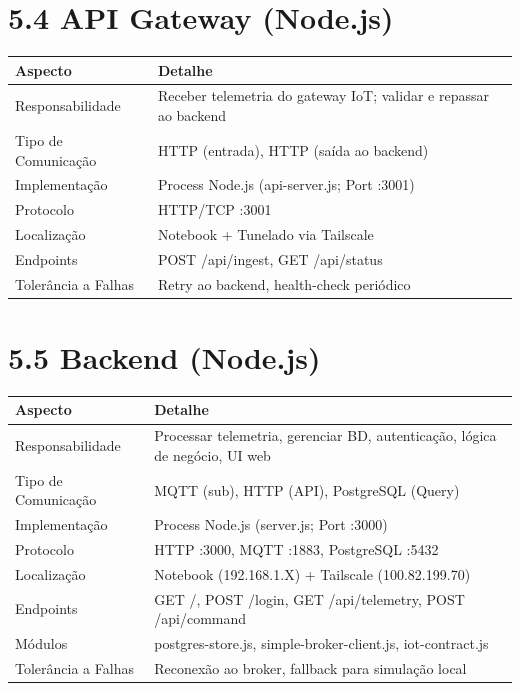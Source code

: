 \documentclass[12pt,a4paper,oneside]{report}
\begin{document}
\section{5.4 API Gateway (Node.js)}

\begin{center}
\begin{tabular}{|m{3cm}|m{10cm}|}
    \hline
    \rowcolor{lightblue}
    \textbf{Aspecto} & \textbf{Detalhe} \\
    \hline
    Responsabilidade & Receber telemetria do gateway IoT; validar e repassar ao backend \\
    \hline
    Tipo de Comunicação & HTTP (entrada), HTTP (saída ao backend) \\
    \hline
    Implementação & Process Node.js (api-server.js; Port :3001) \\
    \hline
    Protocolo & HTTP/TCP :3001 \\
    \hline
    Localização & Notebook + Tunelado via Tailscale \\
    \hline
    Endpoints & POST /api/ingest, GET /api/status \\
    \hline
    Tolerância a Falhas & Retry ao backend, health-check periódico \\
    \hline
\end{tabular}
\end{center}

\section{5.5 Backend (Node.js)}

\begin{center}
\begin{tabular}{|m{3cm}|m{10cm}|}
    \hline
    \rowcolor{lightblue}
    \textbf{Aspecto} & \textbf{Detalhe} \\
    \hline
    Responsabilidade & Processar telemetria, gerenciar BD, autenticação, lógica de negócio, UI web \\
    \hline
    Tipo de Comunicação & MQTT (sub), HTTP (API), PostgreSQL (Query) \\
    \hline
    Implementação & Process Node.js (server.js; Port :3000) \\
    \hline
    Protocolo & HTTP :3000, MQTT :1883, PostgreSQL :5432 \\
    \hline
    Localização & Notebook (192.168.1.X) + Tailscale (100.82.199.70) \\
    \hline
    Endpoints & GET /, POST /login, GET /api/telemetry, POST /api/command \\
    \hline
    Módulos & postgres-store.js, simple-broker-client.js, iot-contract.js \\
    \hline
    Tolerância a Falhas & Reconexão ao broker, fallback para simulação local \\
    \hline
\end{tabular}
\end{center}
\end{document}
